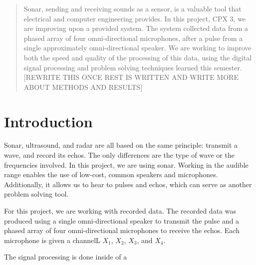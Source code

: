 

\begin{abstract}

Sonar, sending and receiving sounds as a sensor, is a valuable tool that electrical and computer engineering provides.  In this project, CPX 3, we are improving upon a provided system.  The system collected data from a phased array of four omni-directional microphones, after a pulse from a single approximately omni-directional speaker.  We are working to improve both the speed and quality of the processing of this data, using the digital signal processing and problem solving techniques learned this semester. [REWRITE THIS ONCE REST IS WRITTEN AND WRITE MORE ABOUT METHODS AND RESULTS]


\end{abstract}

\section{Introduction}

Sonar, ultrasound, and radar are all based on the same principle: transmit a wave, and record its echos.  The only differences are the type of wave or the frequencies involved.  In this project, we are using sonar.  Working in the audible range enables the use of low-cost, common speakers and microphones.  Additionally, it allows us to hear to pulses and echos, which can serve as another problem solving tool.

For this project, we are working with recorded data.  The recorded data was produced using a single omni-directional speaker to transmit the pulse and a phased array of four omni-directional microphones to receive the echos.  Each microphone is given a channelL $X_1$, $X_2$, $X_3$, and $X_4$.

The signal processing is done inside of a 